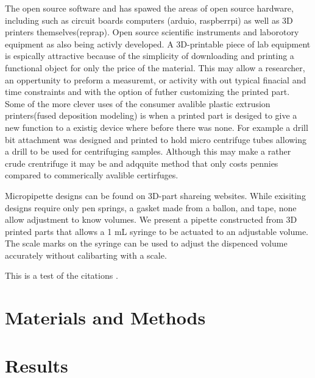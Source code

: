The open source software and has spawed the areas of open source hardware, including such as circuit boards computers (arduio, raspberrpi) as well as 3D printers themselves(reprap). 
Open source scientific instruments and laborotory equipment as also being activly developed.
A 3D-printable piece of lab equipment is espically attractive because of the simplicity of downloading and printing a functional object for only the price of the material. 
This may allow a researcher, an oppertunity to preform a measuremt, or activity with out typical finacial and time constraints and with the option of futher customizing the printed part.
Some of the more clever uses of the consumer avalible plastic extrusion printers(fused deposition modeling) is when a printed part is desiged to give a new function to a existig device where before there was none.
For example a drill bit attachment was designed and printed to hold micro centrifuge tubes allowing a drill to be used for centrifuging samples. 
Although this may make a rather crude crentrifuge it may be and adqquite method that only costs pennies compared to commerically avalible certirfuges.

Micropipette designs can be found on 3D-part shareing websites.
While exisiting designs require only pen springs, a gasket made from a ballon, and tape, none allow adjustment to know volumes.
We present a pipette constructed from 3D printed parts that allows a 1 mL syringe to be actuated to an adjustable volume.
The scale marks on the syringe can be used to adjust the dispenced volume accurately without calibarting with a scale.



This is a test of the citations \cite{oppegard2010}.


\section*{Materials and Methods}

\section*{Results}

